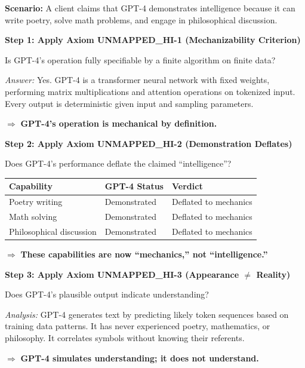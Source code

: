 \begin{tcolorbox}[colback=yellow!5!white, colframe=yellow!75!black,
    title=\textbf{Worked Example: Is GPT-4 ``Intelligent''?}]

\textbf{Scenario:} A client claims that GPT-4 demonstrates intelligence because it can write poetry, solve math problems, and engage in philosophical discussion.

\textbf{Step 1: Apply Axiom UNMAPPED_HI-1 (Mechanizability Criterion)}

Is GPT-4's operation fully specifiable by a finite algorithm on finite data?

\textit{Answer:} Yes. GPT-4 is a transformer neural network with fixed weights, performing matrix multiplications and attention operations on tokenized input. Every output is deterministic given input and sampling parameters.

$\Rightarrow$ \textbf{GPT-4's operation is mechanical by definition.}

\textbf{Step 2: Apply Axiom UNMAPPED_HI-2 (Demonstration Deflates)}

Does GPT-4's performance deflate the claimed ``intelligence''?

\begin{center}
\begin{tabular}{lll}
\textbf{Capability} & \textbf{GPT-4 Status} & \textbf{Verdict} \\
\midrule
Poetry writing & Demonstrated & Deflated to mechanics \\
Math solving & Demonstrated & Deflated to mechanics \\
Philosophical discussion & Demonstrated & Deflated to mechanics \\
\end{tabular}
\end{center}

$\Rightarrow$ \textbf{These capabilities are now ``mechanics,'' not ``intelligence.''}

\textbf{Step 3: Apply Axiom UNMAPPED_HI-3 (Appearance $\neq$ Reality)}

Does GPT-4's plausible output indicate understanding?

\textit{Analysis:} GPT-4 generates text by predicting likely token sequences based on training data patterns. It has never experienced poetry, mathematics, or philosophy. It correlates symbols without knowing their referents.

$\Rightarrow$ \textbf{GPT-4 simulates understanding; it does not understand.}


\end{tcolorbox}
